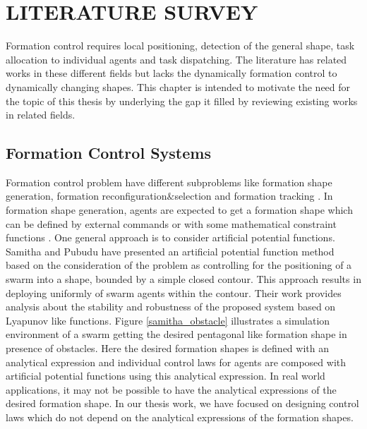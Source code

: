 

\chapter{LITERATURE SURVEY}
\label{chp:Literature Survey}







Formation control requires local positioning, detection of the general shape, task allocation to individual agents and task dispatching. The literature has related works in these different fields but lacks the dynamically formation control to dynamically changing shapes. This chapter is intended to motivate the need for the topic of this thesis by underlying the gap it filled by reviewing existing works in related fields. 

\section{Formation Control Systems}
Formation control problem have different subproblems like formation shape generation, formation reconfiguration$\&$selection and formation tracking \cite{12}.  
In formation shape generation, agents are expected to get a formation shape which can be defined by external commands or with some mathematical constraint functions \cite{16}.  One general approach is to consider artificial potential functions. Samitha and Pubudu \cite{17} have presented an artificial potential function method  based on the consideration of the problem as controlling for the positioning of a swarm into a shape, bounded by a simple closed contour. This approach results in deploying uniformly of swarm agents within the contour.  Their work provides analysis about the stability and robustness of the proposed system based on Lyapunov like functions. Figure \ref{samitha_obstacle} illustrates a simulation environment of a swarm getting the desired pentagonal like formation shape in presence of obstacles. Here the desired formation shapes is defined with an analytical expression and individual control laws for agents are composed with artificial potential functions using this analytical expression. In real world applications, it may not be possible to have the analytical expressions of the desired formation shape. In our thesis work, we have focused on designing control laws which do not depend on the analytical expressions of the formation shapes.

